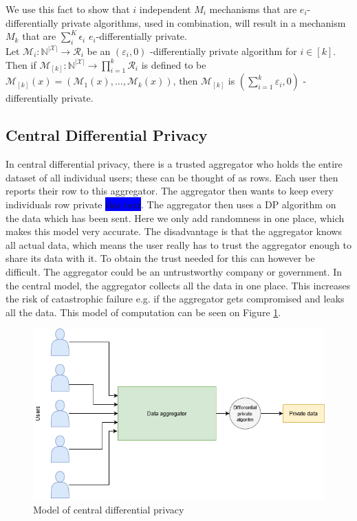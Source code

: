 \documentclass[11pt]{article}
\theoremstyle{definition}
\begin{document}
We use this fact to show that $i$ independent $M_i$ mechanisms that are $e_i$-differentially private algorithms, used in combination, will result in a mechanism $M_k$ that are  $\sum_i^K\epsilon_i$ $e_i$-differentially private.\\ Let $\mathcal{M}_{i}: \mathbb{N}^{|\mathcal{X}|} \rightarrow \mathcal{R}_{i}$ be an $\left(\varepsilon_{i}, 0\right)$ -differentially private algorithm for $i \in[k]$. Then if $\mathcal{M}_{[k]}: \mathbb{N}^{|\mathcal{X}|} \rightarrow \prod_{i=1}^{k} \mathcal{R}_{i}$ is defined to be $\mathcal{M}_{[k]}(x)=\left(\mathcal{M}_{1}(x), \ldots, \mathcal{M}_{k}(x)\right)$, then $\mathcal{M}_{[k]}$ is $\left(\sum_{i=1}^{k} \varepsilon_{i}, 0\right)$ -differentially private.

\subsection{Central Differential Privacy}
In central differential privacy, there is a trusted aggregator who holds the entire dataset of all individual users; these can be thought of as rows. Each user then reports their row to this aggregator. The aggregator then wants to keep every individuals row private \colorbox{blue}{this text}. The aggregator then uses a DP algorithm on the data which has been sent. Here we only add randomness in one place, which makes this model very accurate. The disadvantage is that the aggregator knows all actual data, which means the user really has to trust the aggregator enough to share its data with it. To obtain the trust needed for this can however be difficult. The aggregator could be an untrustworthy company or government. In the central model, the aggregator collects all the data in one place. This increases the risk of catastrophic failure e.g. if the aggregator gets compromised and leaks all the data.
This model of computation can be seen on Figure \ref{fig:model_cen_dp}.
\begin{figure}[H]
    \centering
    \includegraphics[width = .8\textwidth]{figures/DP_cen.png}
    \caption{Model of central differential privacy}
    \label{fig:model_cen_dp}
\end{figure}
\end{document}
